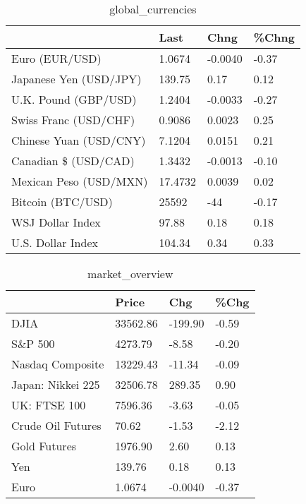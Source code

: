 \documentclass{article}%
\begin{document}
%


\begin{table}[htbp]%
\caption{global\_currencies}%
\centering%
\begin{adjustbox}{width=1\textwidth}%
\begin{tabular}{llll}
\toprule
                       &    Last &    Chng & \%Chng \\
\midrule
        Euro (EUR/USD) &  1.0674 & -0.0040 & -0.37 \\
Japanese Yen (USD/JPY) &  139.75 &    0.17 &  0.12 \\
  U.K. Pound (GBP/USD) &  1.2404 & -0.0033 & -0.27 \\
 Swiss Franc (USD/CHF) &  0.9086 &  0.0023 &  0.25 \\
Chinese Yuan (USD/CNY) &  7.1204 &  0.0151 &  0.21 \\
  Canadian \$ (USD/CAD) &  1.3432 & -0.0013 & -0.10 \\
Mexican Peso (USD/MXN) & 17.4732 &  0.0039 &  0.02 \\
     Bitcoin (BTC/USD) &   25592 &     -44 & -0.17 \\
      WSJ Dollar Index &   97.88 &    0.18 &  0.18 \\
     U.S. Dollar Index &  104.34 &    0.34 &  0.33 \\
\bottomrule
\end{tabular}
%
\end{adjustbox}%
\end{table}

%


\begin{table}[htbp]%
\caption{market\_overview}%
\centering%
\begin{adjustbox}{width=1\textwidth}%
\begin{tabular}{llll}
\toprule
                  &    Price &     Chg &  \%Chg \\
\midrule
             DJIA & 33562.86 & -199.90 & -0.59 \\
          S\&P 500 &  4273.79 &   -8.58 & -0.20 \\
 Nasdaq Composite & 13229.43 &  -11.34 & -0.09 \\
Japan: Nikkei 225 & 32506.78 &  289.35 &  0.90 \\
     UK: FTSE 100 &  7596.36 &   -3.63 & -0.05 \\
Crude Oil Futures &    70.62 &   -1.53 & -2.12 \\
     Gold Futures &  1976.90 &    2.60 &  0.13 \\
              Yen &   139.76 &    0.18 &  0.13 \\
             Euro &   1.0674 & -0.0040 & -0.37 \\
\bottomrule
\end{tabular}
%
\end{adjustbox}%
\end{table}

%
\end{document}
